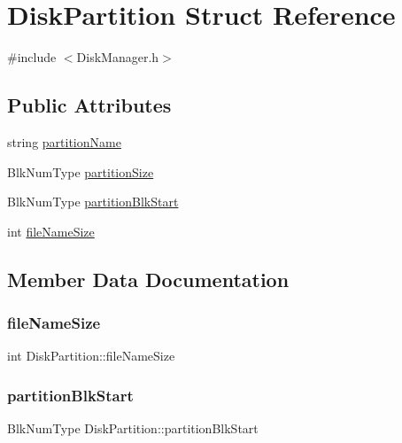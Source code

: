 \hypertarget{struct_disk_partition}{}\section{Disk\+Partition Struct Reference}
\label{struct_disk_partition}


{\ttfamily \#include $<$Disk\+Manager.\+h$>$}

\subsection*{Public Attributes}
\begin{DoxyCompactItemize}
\item 
string \mbox{\hyperlink{struct_disk_partition_a8c89b5f115fa534a3cb5d76505de97cb}{partition\+Name}}
\item 
Blk\+Num\+Type \mbox{\hyperlink{struct_disk_partition_a61dfe31b8baf361738168c2521c19286}{partition\+Size}}
\item 
Blk\+Num\+Type \mbox{\hyperlink{struct_disk_partition_a2b5b89e7739ffa6ac21772a92f88e35f}{partition\+Blk\+Start}}
\item 
int \mbox{\hyperlink{struct_disk_partition_a6fd44394d9d8bf83fa61cfd12be25412}{file\+Name\+Size}}
\end{DoxyCompactItemize}


\subsection{Member Data Documentation}
\mbox{\label{struct_disk_partition_a6fd44394d9d8bf83fa61cfd12be25412}} 
\subsubsection{\texorpdfstring{file\+Name\+Size}{fileNameSize}}
{\footnotesize\ttfamily int Disk\+Partition\+::file\+Name\+Size}

\mbox{\label{struct_disk_partition_a2b5b89e7739ffa6ac21772a92f88e35f}} 
\subsubsection{\texorpdfstring{partition\+Blk\+Start}{partitionBlkStart}}
{\footnotesize\ttfamily Blk\+Num\+Type Disk\+Partition\+::partition\+Blk\+Start}

